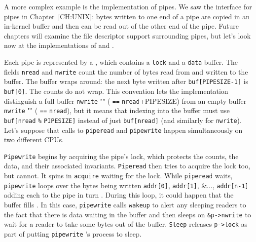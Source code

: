 A more complex example is the implementation of pipes.
We saw the interface for pipes in Chapter~\ref{CH:UNIX}:
bytes written to one end of a pipe are copied
in an in-kernel buffer and then can be read out
of the other end of the pipe.
Future chapters will examine the file descriptor support
surrounding pipes, but let's look now at the
implementations of 
and
.

Each pipe
is represented by a 
,
which contains
a 
\lstinline{lock}
and a 
\lstinline{data}
buffer.
The fields
\lstinline{nread}
and
\lstinline{nwrite}
count the number of bytes read from
and written to the buffer.
The buffer wraps around:
the next byte written after
\lstinline{buf[PIPESIZE-1]}
is 
\lstinline{buf[0]}.
The counts do not wrap.
This convention lets the implementation
distinguish a full buffer 
\lstinline{nwrite} "" (
\lstinline{==}
\lstinline{nread}+PIPESIZE)
from an empty buffer
\lstinline{nwrite} "" (
\lstinline{==}
\lstinline{nread}),
but it means that indexing into the buffer
must use
\lstinline{buf[nread}
\lstinline{%}
\lstinline{PIPESIZE]}
instead of just
\lstinline{buf[nread]} 
(and similarly for
\lstinline{nwrite}).
Let's suppose that calls to
\lstinline{piperead}
and
\lstinline{pipewrite}
happen simultaneously on two different CPUs.

\lstinline{Pipewrite}
begins by acquiring the pipe's lock, which
protects the counts, the data, and their
associated invariants.
\lstinline{Piperead}
then tries to acquire the lock too, but cannot.
It spins in
\lstinline{acquire}
waiting for the lock.
While
\lstinline{piperead}
waits,
\lstinline{pipewrite}
loops over the bytes being written
\lstinline{addr[0]},
\lstinline{addr[1]},
\&...,
\lstinline{addr[n-1]}
adding each to the pipe in turn
.
During this loop, it could happen that
the buffer fills
.
In this case, 
\lstinline{pipewrite}
calls
\lstinline{wakeup}
to alert any sleeping readers to the fact
that there is data waiting in the buffer
and then sleeps on
\lstinline{&p->nwrite}
to wait for a reader to take some bytes
out of the buffer.
\lstinline{Sleep}
releases 
\lstinline{p->lock}
as part of putting
\lstinline{pipewrite} 's
process to sleep.


